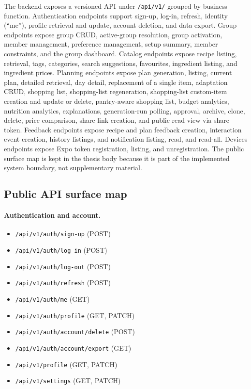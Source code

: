 The backend exposes a versioned API under \texttt{/api/v1/} grouped by business function. Authentication endpoints support sign-up, log-in, refresh, identity (``me''), profile retrieval and update, account deletion, and data export. Group endpoints expose group CRUD, active-group resolution, group activation, member management, preference management, setup summary, member constraints, and the group dashboard. Catalog endpoints expose recipe listing, retrieval, tags, categories, search suggestions, favourites, ingredient listing, and ingredient prices. Planning endpoints expose plan generation, listing, current plan, detailed retrieval, day detail, replacement of a single item, adaptation CRUD, shopping list, shopping-list regeneration, shopping-list custom-item creation and update or delete, pantry-aware shopping list, budget analytics, nutrition analytics, explanations, generation-run polling, approval, archive, clone, delete, price comparison, share-link creation, and public-read view via share token. Feedback endpoints expose recipe and plan feedback creation, interaction event creation, history listings, and notification listing, read, and read-all. Devices endpoints expose Expo token registration, listing, and unregistration. The public surface map is kept in the thesis body because it is part of the implemented system boundary, not supplementary material.

\subsection{Public API surface map}

\paragraph{Authentication and account.}
\begin{itemize}
\item \texttt{/api/v1/auth/sign-up} (POST)
\item \texttt{/api/v1/auth/log-in} (POST)
\item \texttt{/api/v1/auth/log-out} (POST)
\item \texttt{/api/v1/auth/refresh} (POST)
\item \texttt{/api/v1/auth/me} (GET)
\item \texttt{/api/v1/auth/profile} (GET, PATCH)
\item \texttt{/api/v1/auth/account/delete} (POST)
\item \texttt{/api/v1/auth/account/export} (GET)
\item \texttt{/api/v1/profile} (GET, PATCH)
\item \texttt{/api/v1/settings} (GET, PATCH)
\end{itemize}

